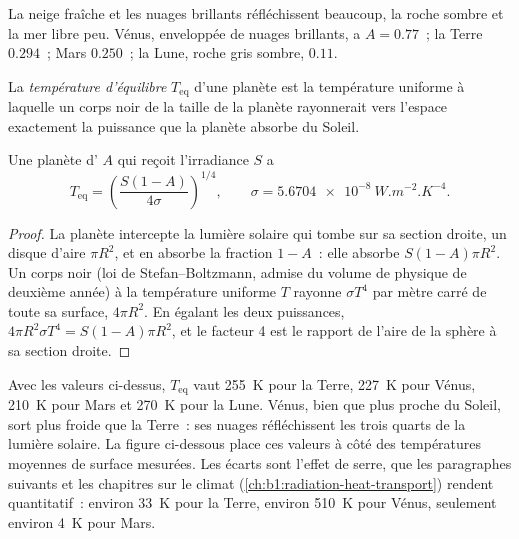 La neige fraîche et les nuages brillants réfléchissent beaucoup, la roche sombre
et la mer libre peu. Vénus, enveloppée de nuages brillants, a $A = 0.77$~; la
Terre $0.294$~; Mars $0.250$~; la Lune, roche gris sombre, $0.11$.

\begin{definition}\label{def:b1:comparative-planetology:equilibrium-temperature}
La \emph{température d'équilibre} $T_\mathrm{eq}$
d'une planète est la température uniforme à laquelle un corps noir de la taille
de la planète rayonnerait vers l'espace exactement la puissance que la planète
absorbe du Soleil.
\end{definition}

\begin{proposition}\label{prop:b1:comparative-planetology:teq}
Une planète d' $A$ qui reçoit l'irradiance $S$ a
\[
  T_\mathrm{eq} = \left(\frac{S(1 - A)}{4\sigma}\right)^{1/4},
  \qquad \sigma = \qty{5.6704e-8}{W.m^{-2}.K^{-4}} .
\]
\end{proposition}

\begin{proof}
La planète intercepte la lumière solaire qui tombe sur sa section droite, un
disque d'aire $\pi R^2$, et en absorbe la fraction $1 - A$~: elle absorbe $S(1 - A)\pi
R^2$. Un corps noir (loi de Stefan--Boltzmann, admise du volume de physique de
deuxième année) à la température uniforme $T$ rayonne $\sigma T^4$ par mètre
carré de toute sa surface, $4\pi R^2$. En égalant les deux puissances,
$4\pi R^2\sigma T^4 = S(1 - A)\pi R^2$, et le facteur 4 est le rapport de l'aire
de la sphère à sa section droite.
\end{proof}

Avec les valeurs ci-dessus, $T_\mathrm{eq}$ vaut \qty{255}{K} pour la Terre,
\qty{227}{K} pour Vénus, \qty{210}{K} pour Mars et \qty{270}{K} pour la Lune.
Vénus, bien que plus proche du Soleil, sort plus froide que la Terre~: ses
nuages réfléchissent les trois quarts de la lumière solaire. La figure
ci-dessous place ces valeurs à côté des températures moyennes de surface
mesurées. Les écarts sont l'effet de serre, que les paragraphes suivants et les
chapitres sur le climat (\cref{ch:b1:radiation-heat-transport}) rendent
quantitatif~: environ \qty{33}{K} pour la Terre, environ \qty{510}{K} pour
Vénus, seulement environ \qty{4}{K} pour Mars.

